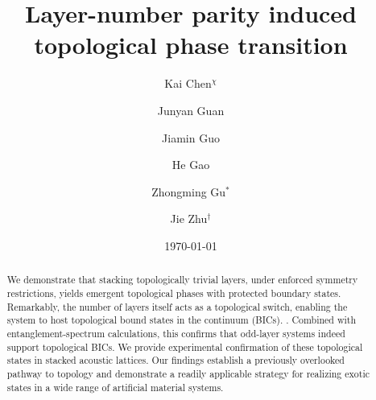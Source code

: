 \documentclass[twocolumn,english,prl,epsfig,rotate,showpacs,aps, superscriptaddress]{revtex4-2}
\newcommand{\blue}{\color{black}}
\begin{document}
\title{Layer-number parity induced topological phase transition}



\author{Kai Chen$^{\chi}$}



\author{Junyan Guan}



\author{Jiamin Guo}



\author{He Gao}



\author{Zhongming Gu$^{*}$}



\author{Jie Zhu$^{\dagger}$}



\date{\today}

\begin{abstract}
We demonstrate that stacking topologically trivial layers, under enforced symmetry restrictions, yields emergent topological phases with protected boundary states. Remarkably, the number of layers itself acts as a topological switch, enabling the system to host topological bound states in the continuum (BICs).  {\blue{Analytically, we reveal that an odd-layer configuration not only renders the spectrum gapless but also supports BICs protected by interlayer reflection symmetry}}. Combined with entanglement-spectrum calculations, this confirms that odd-layer systems indeed support topological BICs. We provide experimental confirmation of these topological states in stacked acoustic lattices. Our findings establish a previously overlooked pathway to topology and demonstrate a readily applicable strategy for realizing exotic states in a wide range of artificial material systems.
\end{abstract}
\maketitle
\end{document}
